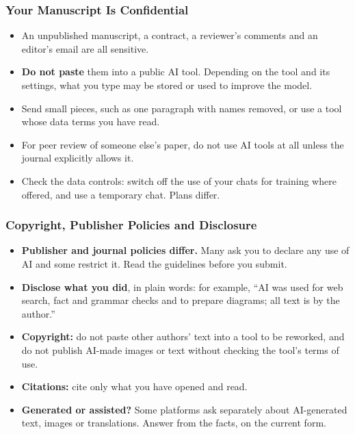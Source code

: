 
\begin{frame}[fragile]\frametitle{Your Manuscript Is Confidential}
\begin{itemize}
\item An unpublished manuscript, a contract, a reviewer's comments and an editor's email are all sensitive.
\item \textbf{Do not paste} them into a public AI tool. Depending on the tool and its settings, what you type may be stored or used to improve the model.
\item Send small pieces, such as one paragraph with names removed, or use a tool whose data terms you have read.
\item For peer review of someone else's paper, do not use AI tools at all unless the journal explicitly allows it.
\item Check the data controls: switch off the use of your chats for training where offered, and use a temporary chat. Plans differ.
\end{itemize}
\end{frame}

\begin{frame}[fragile]\frametitle{Copyright, Publisher Policies and Disclosure}
\begin{itemize}
\item \textbf{Publisher and journal policies differ.} Many ask you to declare any use of AI and some restrict it. Read the guidelines before you submit.
\item \textbf{Disclose what you did}, in plain words: for example, ``AI was used for web search, fact and grammar checks and to prepare diagrams; all text is by the author.''
\item \textbf{Copyright:} do not paste other authors' text into a tool to be reworked, and do not publish AI-made images or text without checking the tool's terms of use.
\item \textbf{Citations:} cite only what you have opened and read.
\item \textbf{Generated or assisted?} Some platforms ask separately about AI-generated text, images or translations. Answer from the facts, on the current form.
\end{itemize}
\end{frame}

